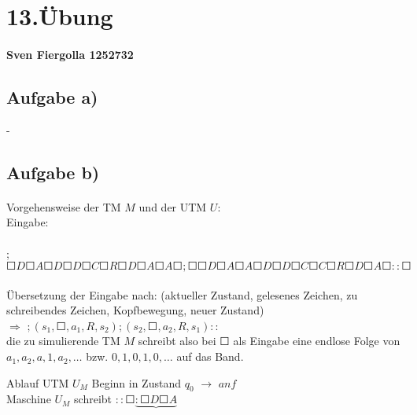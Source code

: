 \documentclass[10pt, a4paper]{article}
\begin{document}
\section*{13.Übung}
\paragraph{Sven Fiergolla 1252732}
\subsection*{Aufgabe a)}

-

\subsection*{Aufgabe b)}

\setlength{\parindent}{0pt}
\paragraph{}
Vorgehensweise der TM $M$ und der UTM $U$:\\
Eingabe:\par

\paragraph{}
\begin{small}
;$\Square D\Square A\Square D\Square D\Square C\Square R\Square D\Square A\Square A\Square ;\Square \Square D\Square A\Square A\Square D\Square D\Square C\Square C\Square R\Square D\Square A\Square ::\Square $\\
\end{small}\par

\paragraph{}
Übersetzung der Eingabe nach: (aktueller Zustand, gelesenes Zeichen, zu schreibendes Zeichen, Kopfbewegung, neuer Zustand)\\
$\Rightarrow$ $;(s_1,\Square ,a_1,R,s_2);(s_2,\Square ,a_2,R,s_1)::$\\
die zu simulierende TM  $M$ schreibt also bei $\Square$ als Eingabe eine endlose Folge von $a_1,a_2,a,1,a_2,\dots$ bzw. $0,1,0,1,0,\dots$ auf das Band.\par
\medskip
Ablauf UTM $U_M$
Beginn in Zustand $q_0$ $\rightarrow$ $anf$ \\ \medskip
Maschine $U_M$ schreibt $::\Square \underbrace{ : \Square D \Square A }$ \par
\end{document}
